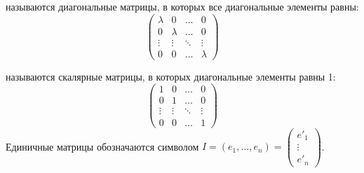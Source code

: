 \begin{opred}
 называются диагональные матрицы, в которых все диагональные элементы равны:
$$
\begin{pmatrix}
\lambda & 0       & \ldots & 0      \\
0       & \lambda & \ldots & 0      \\
\vdots  & \vdots  & \ddots & \vdots \\
0       & 0       & \ldots & \lambda
\end{pmatrix}
$$
\end{opred}
\begin{opred}
 называются скалярные матрицы, в которых диагональные элементы равны 1:
$$
\begin{pmatrix}
1&     0&       \ldots& 0      \\
0&     1&       \ldots& 0      \\
\vdots& \vdots& \ddots& \vdots \\
0&      0&      \ldots& 1
\end{pmatrix}
$$
Единичные матрицы обозначаются символом $I=(e_1,\ldots,e_n)=\begin{pmatrix}
e'_1 \\
\vdots \\
e'_n\end{pmatrix}$.
\end{opred}
